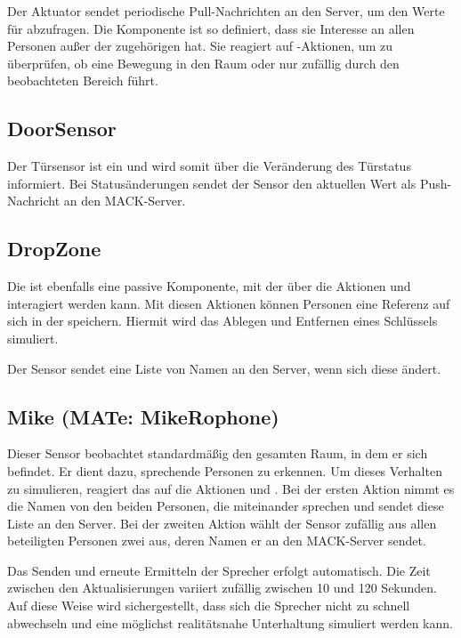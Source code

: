 Der Aktuator sendet periodische Pull-Nachrichten an den Server, um den Werte für  abzufragen. Die Komponente ist so definiert, dass sie Interesse an allen Personen außer der zugehörigen hat. Sie reagiert auf -Aktionen, um zu überprüfen, ob eine Bewegung in den Raum oder nur zufällig durch den beobachteten Bereich führt.

\subsection{DoorSensor}
Der Türsensor ist ein  und wird somit über die Veränderung des Türstatus informiert. Bei Statusänderungen sendet der Sensor den aktuellen Wert als Push-Nachricht an den MACK-Server.

\subsection{DropZone}
Die  ist ebenfalls eine passive Komponente, mit der über die Aktionen  und  interagiert werden kann. Mit diesen Aktionen können Personen eine Referenz auf sich in der  speichern. Hiermit wird das Ablegen und Entfernen eines Schlüssels simuliert.

Der Sensor sendet eine Liste von Namen an den Server, wenn sich diese ändert.

\subsection{Mike (MATe: MikeRophone)}
Dieser Sensor beobachtet standardmäßig den gesamten Raum, in dem er sich befindet. Er dient dazu, sprechende Personen zu erkennen. Um dieses Verhalten zu simulieren, reagiert das  auf die Aktionen  und . Bei der ersten Aktion nimmt es die Namen von den beiden Personen, die miteinander sprechen und sendet diese Liste an den Server. Bei der zweiten Aktion wählt der Sensor zufällig aus allen beteiligten Personen zwei aus, deren Namen er an den MACK-Server sendet. 

Das Senden und erneute Ermitteln der Sprecher erfolgt automatisch. Die Zeit zwischen den Aktualisierungen variiert zufällig zwischen 10 und 120 Sekunden. Auf diese Weise wird sichergestellt, dass sich die Sprecher nicht zu schnell abwechseln und eine möglichst realitätsnahe Unterhaltung simuliert werden kann.
%
%
%

